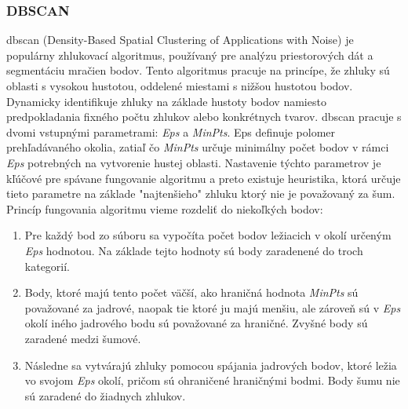 \subsubsection{DBSCAN}
\noindent \acrshort{dbscan} (Density-Based Spatial Clustering of Applications with Noise) je populárny zhlukovací algoritmus, používaný pre analýzu priestorových dát a segmentáciu mračien bodov. Tento algoritmus pracuje na princípe, že zhluky sú oblasti s vysokou hustotou, oddelené miestami s nižšou hustotou bodov. Dynamicky identifikuje zhluky na základe hustoty bodov namiesto predpokladania fixného počtu zhlukov alebo konkrétnych tvarov. \cite{DBSCAN_original} 
\newline\indent \acrshort{dbscan} pracuje s dvomi vstupnými parametrami: \textit{Eps} a \textit{MinPts}. Eps definuje polomer prehľadávaného okolia, zatiaľ čo \textit{MinPts} určuje minimálny počet bodov v rámci \textit{Eps} potrebných na vytvorenie hustej oblasti. Nastavenie týchto parametrov je kľúčové pre spávane fungovanie algoritmu a preto existuje heuristika, ktorá určuje tieto parametre na základe "najtenšieho" zhluku ktorý nie je považovaný za šum. \cite{DBSCAN_original}
\newline\indent Princíp fungovania algoritmu vieme rozdeliť do niekoľkých bodov:
\begin{enumerate}
    \item Pre každý bod zo súboru sa vypočíta počet bodov ležiacich v okolí určeným \textit{Eps} hodnotou. Na základe tejto hodnoty sú body zaradenené do troch kategorií.  
    \item Body, ktoré majú tento počet väčší, ako hraničná hodnota \textit{MinPts} sú považované za jadrové, naopak tie ktoré ju majú menšiu, ale zároveň sú  v \textit{Eps} okolí iného jadrového bodu sú považované za hraničné. Zvyšné body sú zaradené medzi šumové.
    \item Následne sa vytvárajú zhluky pomocou spájania jadrových bodov, ktoré ležia vo svojom \textit{Eps} okolí, pričom sú ohraničené hraničnými bodmi. Body šumu nie sú zaradené do žiadnych zhlukov.
\end{enumerate}

